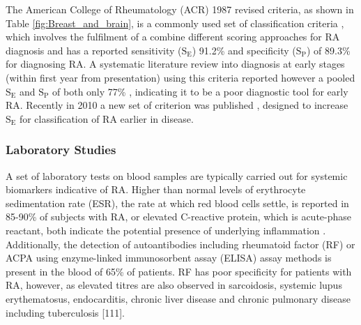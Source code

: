 \documentclass[twoside]{bhamthesis}
\theoremstyle{definition}
\begin{document}
The American College of Rheumatology (ACR) 1987 revised criteria, as shown in Table \ref{fig:Breast_and_brain}, is a commonly used set of classification criteria \cite{arnett1988american}, which involves the fulfilment of a combine different scoring approaches for RA diagnosis and has a reported sensitivity ($\mathrm{S_E}$) 91.2\% and specificity ($\mathrm{S_P}$) of 89.3\% for diagnosing RA. A systematic literature review into diagnosis at early stages (within first year from presentation) using this criteria reported however a pooled $\mathrm{S_E}$ and $\mathrm{S_P}$ of both only 77\% \cite{banal2008sensitivity}, indicating it to be a poor diagnostic tool for early RA. Recently in 2010 a new set of criterion was published \cite{aletaha20102010}, designed to increase $\mathrm{S_E}$ for classification of RA earlier in disease.

\subsubsection{Laboratory Studies}

A set of laboratory tests on blood samples are typically carried out for systemic biomarkers indicative of RA. Higher than normal levels of erythrocyte sedimentation rate (ESR), the rate at which red blood cells settle, is reported in 85-90\% of subjects with RA, or elevated C-reactive protein, which is acute-phase reactant, both indicate the potential presence of underlying inflammation \cite{bluett2014association}. Additionally, the detection of autoantibodies including rheumatoid factor (RF) or ACPA using enzyme-linked immunosorbent assay (ELISA) assay methods is present in the blood of 65\% of patients\cite{aletaha20102010}. RF has poor specificity for patients with RA, however, as elevated titres are also observed in sarcoidosis, systemic lupus erythematosus, endocarditis, chronic liver disease and chronic pulmonary disease including tuberculosis [111].
 



\end{document}
